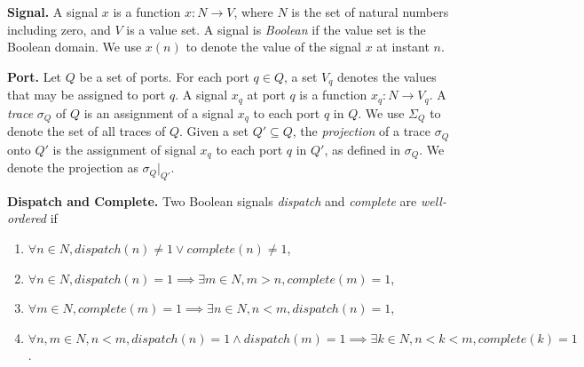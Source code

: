 {\bf Signal.}
A signal $x$ is a function $x: N \rightarrow V$, where $N$ is the set of natural numbers including zero, and $V$ is a value set. 
A signal is \emph{Boolean} if the value set is the Boolean domain.
We use $x(n)$ to denote the value of the signal $x$ at instant $n$. 

{\bf Port.}
Let $Q$  be a set of ports. 
For each port $q \in Q$, a set $V_q$ denotes the values that may be assigned to port $q$. %
A signal $x_q$ at port $q$ is a function $x_q: N \rightarrow V_q$.
A \emph{trace} $\sigma_Q$ of $Q$ is an assignment of a signal $x_q$ to each port $q$ in $Q$.
We use $\Sigma_Q$ to denote the set of all traces of $Q$.
Given a set $Q' \subseteq Q$, the \emph{projection} of a trace $\sigma_Q$ onto $Q'$ is the assignment of signal $x_q$ to each port $q$ in $Q'$, as defined in $\sigma_Q$. We denote the projection as $\sigma_Q|_{Q'}$.
 
{\bf Dispatch and Complete.}
Two Boolean signals \emph{dispatch} and \emph{complete} are \emph{well-ordered} if 

\begin{enumerate}
	\item $\forall n \in N, dispatch(n) \ne 1 \vee complete(n) \ne 1 $,
	\item $ \forall n\in N, dispatch(n) = 1 \implies \exists m\in N, m > n, complete(m) =  1 $,
	\item $ \forall m\in N, complete(m) = 1 \implies \exists n\in N, n < m, dispatch(n) =  1 $,
	\item $ \forall n,m\in N, n < m, dispatch(n) = 1 \wedge dispatch(m) = 1 \implies \exists k\in N, n < k < m, complete(k) = 1 $.
\end{enumerate}

